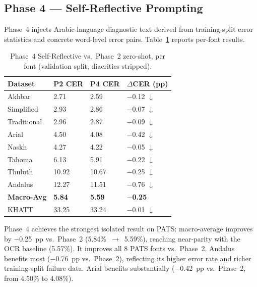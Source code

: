 \subsection{Phase 4 --- Self-Reflective Prompting}
\label{subsec:res_p4}

Phase~4 injects Arabic-language diagnostic text derived from training-split
error statistics and concrete word-level error pairs. Table~\ref{tab:p4_per_font}
reports per-font results.

\begin{table}[htbp]
  \centering
  \caption{Phase~4 Self-Reflective vs.\ Phase~2 zero-shot, per font
           (validation split, diacritics stripped).}
  \label{tab:p4_per_font}
  \begin{tabularx}{\textwidth}{lXXX}
    \toprule
    \textbf{Dataset} & \textbf{P2 CER} & \textbf{P4 CER}
      & \textbf{$\Delta$CER (pp)} \\
    \midrule
    Akhbar       &  2.71 &  2.59 & $-$0.12 $\downarrow$ \\
    Simplified   &  2.93 &  2.86 & $-$0.07 $\downarrow$ \\
    Traditional  &  2.96 &  2.87 & $-$0.09 $\downarrow$ \\
    Arial        &  4.50 &  4.08 & $-$0.42 $\downarrow$ \\
    Naskh        &  4.27 &  4.22 & $-$0.05 $\downarrow$ \\
    Tahoma       &  6.13 &  5.91 & $-$0.22 $\downarrow$ \\
    Thuluth      & 10.92 & 10.67 & $-$0.25 $\downarrow$ \\
    Andalus      & 12.27 & 11.51 & $-$0.76 $\downarrow$ \\
    \midrule
    \textbf{Macro-Avg} & \textbf{5.84} & \textbf{5.59} & \textbf{$-$0.25} \\
    \midrule
    KHATT        & 33.25 & 33.24 & $-$0.01 $\downarrow$ \\
    \bottomrule
  \end{tabularx}
\end{table}

Phase~4 achieves the strongest isolated result on PATS: macro-average
improves by $-$0.25~pp vs.\ Phase~2 (5.84\%~$\to$~5.59\%), reaching
near-parity with the OCR baseline (5.57\%). It improves all 8 PATS fonts
vs.\ Phase~2. Andalus benefits most ($-$0.76~pp vs.\ Phase~2), reflecting
its higher error rate and richer training-split failure data. Arial benefits
substantially ($-$0.42~pp vs.\ Phase~2, from 4.50\% to 4.08\%).


